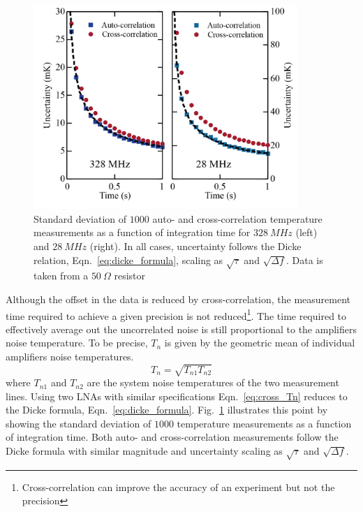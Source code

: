 \begin{figure}
\centering
\includegraphics[width = 100mm]{figures/Johnson_noise_thermometry/cross_sensitivity.png}
\caption{Standard deviation of $1000$ auto- and cross-correlation temperature measurements as a function of integration time for $328~MHz$ (left) and $28~MHz$ (right). In all cases, uncertainty follows the Dicke relation, Eqn.~\ref{eq:dicke_formula}, scaling as $\sqrt{\tau}$ and $\sqrt{\Delta f}$. Data is taken from a $50~\Omega$ resistor}
\label{fig:cross_sensitivity}
\end{figure}

Although the offset in the data is reduced by cross-correlation, the measurement time required to achieve a given precision is not reduced\footnote{Cross-correlation can improve the accuracy of an experiment but not the precision}. The time required to effectively average out the uncorrelated noise is still proportional to the amplifiers noise temperature. To be precise, $T_n$ is given by the geometric mean of individual amplifiers noise temperatures.
\begin{equation}\label{eq:cross_Tn}
T_n = \sqrt{T_{n1}T_{n2}}
\end{equation}
where $T_{n1}$ and $T_{n2}$ are the system noise temperatures of the two measurement lines. Using two LNAs with similar specifications Eqn.~\ref{eq:cross_Tn} reduces to the Dicke formula, Eqn.~\ref{eq:dicke_formula}. Fig.~\ref{fig:cross_sensitivity} illustrates this point by showing the standard deviation of $1000$ temperature measurements as a function of integration time. Both auto- and cross-correlation measurements follow the Dicke formula with similar magnitude and uncertainty scaling as $\sqrt{\tau}$ and $\sqrt{\Delta f}$.
 
